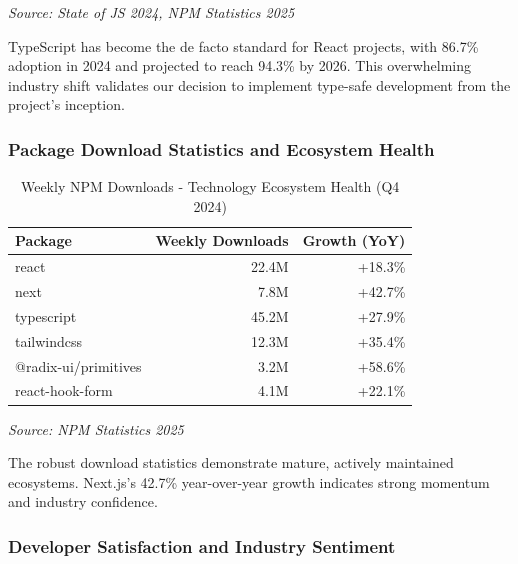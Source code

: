 \textit{Source: State of JS 2024, NPM Statistics 2025}

\vspace{0.3cm}

TypeScript has become the de facto standard for React projects, with 86.7\% adoption in 2024 and projected to reach 94.3\% by 2026. This overwhelming industry shift validates our decision to implement type-safe development from the project's inception.

\subsubsection{Package Download Statistics and Ecosystem Health}

\begin{table}[H]
\centering
\caption{Weekly NPM Downloads - Technology Ecosystem Health (Q4 2024)}
\begin{tabular}{|l|r|r|}
\hline

\textbf{Package} & \textbf{Weekly Downloads} & \textbf{Growth (YoY)} \\
\hline
react & 22.4M & +18.3\% \\
\hline
next & 7.8M & +42.7\% \\
\hline
typescript & 45.2M & +27.9\% \\
\hline
tailwindcss & 12.3M & +35.4\% \\
\hline
@radix-ui/primitives & 3.2M & +58.6\% \\
\hline
react-hook-form & 4.1M & +22.1\% \\
\hline
\end{tabular}
\end{table}

\textit{Source: NPM Statistics 2025}

\vspace{0.3cm}

The robust download statistics demonstrate mature, actively maintained ecosystems. Next.js's 42.7\% year-over-year growth indicates strong momentum and industry confidence.

\subsubsection{Developer Satisfaction and Industry Sentiment}

